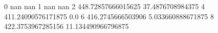 0 nan nan
1 nan nan
2 448.72857666015625 37.4876708984375
4 411.24090576171875 0.0
6 416.2745666503906 5.033660888671875
8 422.3753967285156 11.134490966796875
